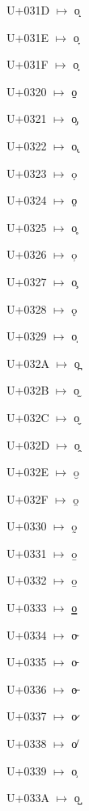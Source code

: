 {\noindent U+031D  $\mapsto$ {\cdmformat o̝}\par
\noindent U+031E  $\mapsto$ {\cdmformat o̞}\par
\noindent U+031F  $\mapsto$ {\cdmformat o̟}\par
\noindent U+0320  $\mapsto$ {\cdmformat o̠}\par
\noindent U+0321  $\mapsto$ {\cdmformat o̡}\par
\noindent U+0322  $\mapsto$ {\cdmformat o̢}\par
\noindent U+0323  $\mapsto$ {\cdmformat ọ}\par
\noindent U+0324  $\mapsto$ {\cdmformat o̤}\par
\noindent U+0325  $\mapsto$ {\cdmformat o̥}\par
\noindent U+0326  $\mapsto$ {\cdmformat o̦}\par
\noindent U+0327  $\mapsto$ {\cdmformat o̧}\par
\noindent U+0328  $\mapsto$ {\cdmformat ǫ}\par
\noindent U+0329  $\mapsto$ {\cdmformat o̩}\par
\noindent U+032A  $\mapsto$ {\cdmformat o̪}\par
\noindent U+032B  $\mapsto$ {\cdmformat o̫}\par
\noindent U+032C  $\mapsto$ {\cdmformat o̬}\par
\noindent U+032D  $\mapsto$ {\cdmformat o̭}\par
\noindent U+032E  $\mapsto$ {\cdmformat o̮}\par
\noindent U+032F  $\mapsto$ {\cdmformat o̯}\par
\noindent U+0330  $\mapsto$ {\cdmformat o̰}\par
\noindent U+0331  $\mapsto$ {\cdmformat o̱}\par
\noindent U+0332  $\mapsto$ {\cdmformat o̲}\par
\noindent U+0333  $\mapsto$ {\cdmformat o̳}\par
\noindent U+0334  $\mapsto$ {\cdmformat o̴}\par
\noindent U+0335  $\mapsto$ {\cdmformat o̵}\par
\noindent U+0336  $\mapsto$ {\cdmformat o̶}\par
\noindent U+0337  $\mapsto$ {\cdmformat o̷}\par
\noindent U+0338  $\mapsto$ {\cdmformat o̸}\par
\noindent U+0339  $\mapsto$ {\cdmformat o̹}\par
\noindent U+033A  $\mapsto$ {\cdmformat o̺}\par
}
